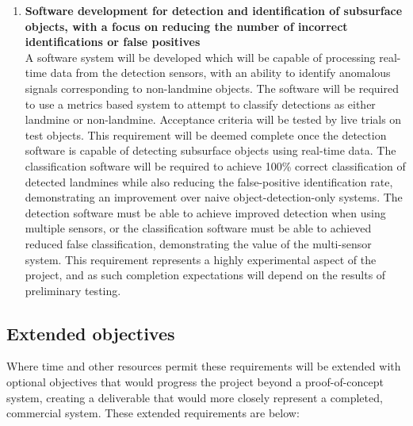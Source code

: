\documentclass[main.tex]{subfiles}
\begin{document}
\begin{enumerate}
\item \textbf{Software development for detection and identification of subsurface objects, with a focus on reducing the number of incorrect identifications or false positives}\\ 
A software system will be developed which will be capable of processing real-time data from the detection sensors, with an ability to identify anomalous signals corresponding to non-landmine objects. 
The software will be required to use a metrics based system to attempt to classify detections as either landmine or non-landmine. 
Acceptance criteria will be tested by live trials on test objects. 
This requirement will be deemed complete once the detection software is capable of detecting subsurface objects using real-time data. 
The classification software will be required to achieve 100\% correct classification of detected landmines while also reducing the false-positive identification rate, demonstrating an improvement over naive object-detection-only systems. 
The detection software must be able to achieve improved detection when using multiple sensors, or the classification software must be able to achieved reduced false classification, demonstrating the value of the multi-sensor system. 
This requirement represents a highly experimental aspect of the project, and as such completion expectations will depend on the results of preliminary testing. 
\end{enumerate}

\subsection{Extended objectives}
Where time and other resources permit these requirements will be extended with optional objectives that would progress the project beyond a proof-of-concept system, creating a deliverable that would more closely represent a completed, commercial system. 
These extended requirements are below:
\end{document}
